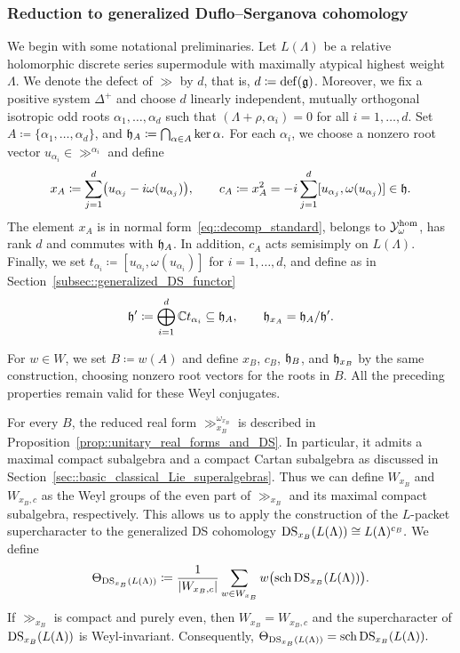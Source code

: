 \subsubsection{Reduction to generalized Duflo--Serganova cohomology} We begin with some notational preliminaries. Let $L(\Lambda)$ be a relative holomorphic discrete series supermodule with maximally atypical highest weight $\Lambda$. We denote the defect of $\gg$ by $d$, that is, $d\coloneqq{\mathrm{def}}({\mathfrak{g}})$. Moreover, we fix a positive system $\Delta^+$ and choose $d$ linearly independent, mutually orthogonal isotropic odd roots $\alpha_1,\ldots,\alpha_d$ such that $(\Lambda+\rho,\alpha_i)=0$ for all $i=1,\ldots,d$. Set
$
A\coloneqq\{\alpha_1,\ldots,\alpha_d\}$, and $
{\mathfrak h}_A\coloneqq\bigcap_{\alpha\in A}\ker\alpha.$
For each $\alpha_i$, we choose a nonzero root vector $u_{\alpha_i}\in\gg^{\alpha_i}$ and define
\begin{equation}\label{eq::def_x_A}
x_A\coloneqq
\sum_{j=1}^d\bigl(u_{\alpha_j}-i\omega(u_{\alpha_j})\bigr),
\qquad
c_A\coloneqq x_A^2
=-i\sum_{j=1}^d[u_{\alpha_j},\omega(u_{\alpha_j})]\in{\mathfrak h}.
\end{equation}
The element $x_A$ is in normal form~\eqref{eq::decomp_standard}, belongs to ${\mathcal Y}^{\hom}_{\omega}$, has rank $d$ and commutes with ${\mathfrak h}_{A}$. In addition, $c_{A}$ acts semisimply on $L(\Lambda)$. Finally, we set
$
t_{\alpha_i}\coloneqq[u_{\alpha_i},\omega(u_{\alpha_i})]
$
for $i=1,\ldots,d$, and define as in Section~\ref{subsec::generalized_DS_functor}
\begin{equation}
{\mathfrak h}'\coloneqq\bigoplus_{i=1}^d{\mathbb C} t_{\alpha_i}
\subseteq{\mathfrak h}_A,
\qquad
{\mathfrak h}_{x_A}={\mathfrak h}_A/{\mathfrak h}'.
\end{equation}


For $w\in W$, we set $B\coloneqq w(A)$ and define $x_B$, $c_B$, ${\mathfrak h}_B$, and ${\mathfrak h}_{x_B}$ by the same construction, choosing nonzero root vectors for the roots in $B$. All the preceding properties remain valid for these Weyl conjugates.


For every $B$, the reduced real form $\gg_{x_B}^{\omega_{x_B}}$ is described in Proposition~\ref{prop::unitary_real_forms_and_DS}. In particular, it admits a maximal compact subalgebra and a compact Cartan subalgebra as discussed in Section~\ref{sec::basic_classical_Lie_superalgebras}. Thus we can define $W_{x_B}$ and $W_{x_B,c}$ as the Weyl groups of the even part of $\gg_{x_B}$ and its maximal compact subalgebra, respectively. This allows us to apply the construction of the $L$-packet supercharacter to the generalized DS cohomology
$
\operatorname{DS}_{x_B}(L(\Lambda))\cong L(\Lambda)^{c_B}.
$
We define
\begin{equation}
\Theta_{\operatorname{DS}_{x_B}(L(\Lambda))}
\coloneqq
\frac{1}{|W_{x_B,c}|}
\sum_{w\in W_{x_B}}
w\bigl({\operatorname{sch}}\operatorname{DS}_{x_B}(L(\Lambda))\bigr).
\end{equation}
If $\gg_{x_B}$ is compact and purely even, then $W_{x_B}=W_{x_B,c}$ and the supercharacter of $\operatorname{DS}_{x_B}(L(\Lambda))$ is Weyl-invariant. Consequently, $
\Theta_{\operatorname{DS}_{x_B}(L(\Lambda))}
=
{\operatorname{sch}}\operatorname{DS}_{x_B}(L(\Lambda)).
$

